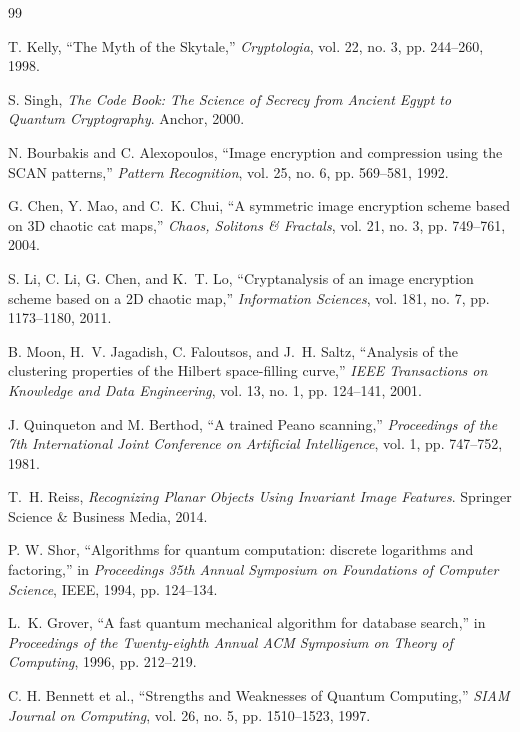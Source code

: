 \documentclass[12pt,fleqn]{article}
\begin{document}
\begin{thebibliography}{99}

T. Kelly, ``The Myth of the Skytale,'' \textit{Cryptologia}, vol. 22, no. 3, pp. 244--260, 1998.

S. Singh, \textit{The Code Book: The Science of Secrecy from Ancient Egypt to Quantum Cryptography}. Anchor, 2000.

N. Bourbakis and C. Alexopoulos, ``Image encryption and compression using the SCAN patterns,'' \textit{Pattern Recognition}, vol. 25, no. 6, pp. 569--581, 1992.

G. Chen, Y. Mao, and C.~K. Chui, ``A symmetric image encryption scheme based on 3D chaotic cat maps,'' \textit{Chaos, Solitons \& Fractals}, vol. 21, no. 3, pp. 749--761, 2004.

S. Li, C. Li, G. Chen, and K.~T. Lo, ``Cryptanalysis of an image encryption scheme based on a 2D chaotic map,'' \textit{Information Sciences}, vol. 181, no. 7, pp. 1173--1180, 2011.

B. Moon, H.~V. Jagadish, C. Faloutsos, and J.~H. Saltz, ``Analysis of the clustering properties of the Hilbert space-filling curve,'' \textit{IEEE Transactions on Knowledge and Data Engineering}, vol. 13, no. 1, pp. 124--141, 2001.

J. Quinqueton and M. Berthod, ``A trained Peano scanning,'' \textit{Proceedings of the 7th International Joint Conference on Artificial Intelligence}, vol. 1, pp. 747--752, 1981.

T.~H. Reiss, \textit{Recognizing Planar Objects Using Invariant Image Features}. Springer Science \& Business Media, 2014.

P. W. Shor, ``Algorithms for quantum computation: discrete logarithms and factoring,'' in \textit{Proceedings 35th Annual Symposium on Foundations of Computer Science}, IEEE, 1994, pp. 124--134.

L.~K. Grover, ``A fast quantum mechanical algorithm for database search,'' in \textit{Proceedings of the Twenty-eighth Annual ACM Symposium on Theory of Computing}, 1996, pp. 212--219.

C. H. Bennett et al., ``Strengths and Weaknesses of Quantum Computing,'' \textit{SIAM Journal on Computing}, vol. 26, no. 5, pp. 1510--1523, 1997.


\end{thebibliography}
\end{document}
